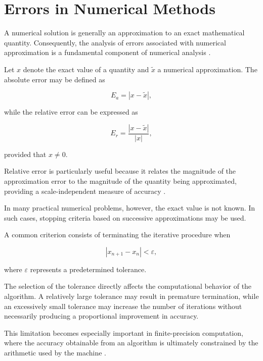 \section{Errors in Numerical Methods}

A numerical solution is generally an approximation to an exact mathematical
quantity. Consequently, the analysis of errors associated with numerical
approximation is a fundamental component of numerical analysis
\cite{burden2016numerical,chapra2021numerical}.

Let $x$ denote the exact value of a quantity and $\tilde{x}$ a numerical
approximation. The absolute error may be defined as

\begin{equation}
    E_a = |x-\tilde{x}|,
\end{equation}

while the relative error can be expressed as

\begin{equation}
    E_r =
    \frac{|x-\tilde{x}|}{|x|},
\end{equation}

provided that $x \neq 0$.

Relative error is particularly useful because it relates the magnitude of the
approximation error to the magnitude of the quantity being approximated,
providing a scale-independent measure of accuracy
\cite{chapra2021numerical}.

In many practical numerical problems, however, the exact value is not known.
In such cases, stopping criteria based on successive approximations may be
used.

A common criterion consists of terminating the iterative procedure when

\begin{equation}
    |x_{n+1}-x_n| < \varepsilon,
\end{equation}

where $\varepsilon$ represents a predetermined tolerance.

The selection of the tolerance directly affects the computational behavior of
the algorithm. A relatively large tolerance may result in premature
termination, while an excessively small tolerance may increase the number of
iterations without necessarily producing a proportional improvement in
accuracy.

This limitation becomes especially important in finite-precision computation,
where the accuracy obtainable from an algorithm is ultimately constrained by
the arithmetic used by the machine
\cite{higham2002accuracy}.